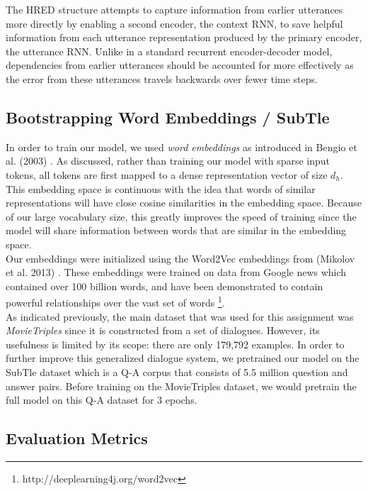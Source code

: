 \documentclass[11pt]{article}
\begin{document}
\noindent The HRED structure attempts to capture information from earlier utterances more directly by enabling a second encoder, the context RNN, to save helpful information from each utterance representation produced by the primary encoder, the utterance RNN. Unlike in a standard recurrent encoder-decoder model, dependencies from earlier utterances should be accounted for more effectively as the error from these utterances travels backwards over fewer time steps.

\subsection{Bootstrapping Word Embeddings / SubTle}

In order to train our model, we used {\it word embeddings} as introduced in Bengio et al. (2003) \cite{bengio-emb}. As discussed, rather than training our model with sparse input tokens, all tokens are first mapped to a dense representation vector of size $d_{h}$. This embedding space is continuous with the idea that words of similar representations will have close cosine similarities in the embedding space. Because of our large vocabulary size, this greatly improves the speed of training since the model will share information between words that are similar in the embedding space. \\

\noindent Our embeddings were initialized using the Word2Vec embeddings from (Mikolov et al. 2013) \cite{word2vec}. These embeddings were trained on data from Google news which contained over 100 billion words, and have been demonstrated to contain powerful relationships over the vast set of words \footnote{http://deeplearning4j.org/word2vec}. \\

\noindent As indicated previously, the main dataset that was used for this assignment was {\it MovieTriples} since it is constructed from a set of dialogues. However, its usefulness is limited by its scope: there are only 179,792 examples. In order to further improve this generalized dialogue system, we pretrained our model on the SubTle dataset which is a Q-A corpus that consists of 5.5 million question and answer pairs. Before training on the MovieTriples dataset, we would pretrain the full model on this Q-A dataset for 3 epochs. 

\subsection{Evaluation Metrics}
\end{document}
